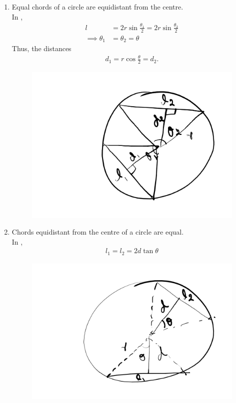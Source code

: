 \begin{enumerate}[label=\thesubsection.\arabic*,ref=\thesubsection.\theenumi]
\item  Equal chords of a circle  are equidistant from the centre.
	\\
		\solution 
	In ,	
\begin{align}
	l &= 2r\sin \frac{\theta_1}{2}
	= 2r\sin \frac{\theta_2}{2}
	\\
	\implies \theta_1 &= \theta_2 = \theta
\end{align}
Thus, the distances
\begin{align}
	d_1 = r \cos \frac{\theta}{2} = d_2.
\end{align}
\begin{figure}[H]
	\begin{center}
		{\includegraphics[width=0.6\columnwidth]{figs/ncert/circle/1.png}}
	\end{center}
	\caption{}
	\label{fig:ncert-circ-1}	
\end{figure}
%
\item Chords equidistant from the centre  of a circle  are equal.
\\
\solution
	In , 
\begin{align}
	l_1 = l_2 = 2d \tan \theta
\end{align}
\begin{figure}[H]
	\begin{center}
		{\includegraphics[width=0.6\columnwidth]{figs/ncert/circle/10.png}}

\end{center}
\end{figure}
\end{enumerate}
